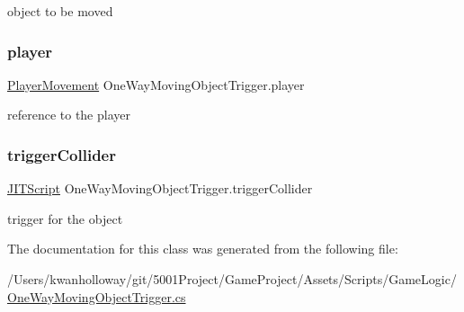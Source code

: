 object to be moved 

\mbox{\label{class_one_way_moving_object_trigger_a50456b25de1017bd53ae8950dff38148}} 
\subsubsection{\texorpdfstring{player}{player}}
{\footnotesize\ttfamily \hyperlink{class_player_movement}{Player\+Movement} One\+Way\+Moving\+Object\+Trigger.\+player}



reference to the player 

\mbox{\label{class_one_way_moving_object_trigger_a826ac8904700117919e40f3954901ba6}} 
\subsubsection{\texorpdfstring{trigger\+Collider}{triggerCollider}}
{\footnotesize\ttfamily \hyperlink{class_j_i_t_script}{J\+I\+T\+Script} One\+Way\+Moving\+Object\+Trigger.\+trigger\+Collider}



trigger for the object 



The documentation for this class was generated from the following file\+:\begin{DoxyCompactItemize}
\item 
/\+Users/kwanholloway/git/5001\+Project/\+Game\+Project/\+Assets/\+Scripts/\+Game\+Logic/\hyperlink{_one_way_moving_object_trigger_8cs}{One\+Way\+Moving\+Object\+Trigger.\+cs}\end{DoxyCompactItemize}
